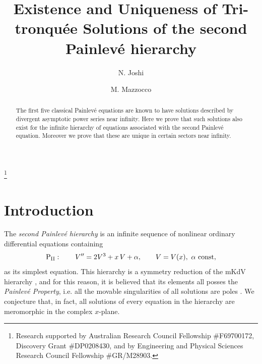 \documentclass{amsart}
\theoremstyle{definition}
\theoremstyle{remark}
\theoremstyle{remark}
\begin{document}
\newcommand\Pa{Painlev\'e}
\newcommand\Pt{{\rm P}_{\rm{\scriptstyle II}}}
\newcommand\Ptn{{\rm P}^{(n)}_{\rm{\scriptstyle II}}}
\newcommand\Lr{{\mathcal L}}
\newcommand\Pol{{\mathcal P}}
\newcommand\Se{{\mathcal S}}
\newcommand\A{{\mathcal A}}
\newcommand\M{{\mathsf M}}
\newcommand\Complex{{\mathbb C}}
\newcommand\Real{{\mathbb R}}
\newcommand{\ID}{\mathbb{1}}
\newcommand\Integer{{\mathbb Z}}
\def\ddt{{{\rm d}\over{\rm d} t}}
\def\ddx{{{\rm d}\over{\rm d} x}}
\def\ddtt{{{\rm d}\over{\rm d}\tau}}
\def\ddz{{{\rm d}\over{\rm d} z}}
\def\thi{{\vartheta_\infty}}
\def\eps{\varepsilon}
\def\arg{{\rm arg}}
\def\iff{\Longleftrightarrow}
\def\U{{\mathcal U}}


\title[Tritronqu\'ee Solutions of the Second Painlev\'e Hierarchy]
{Existence and
Uniqueness of Tri-tronqu\'ee Solutions of the second Painlev\'e
hierarchy}

\author{N. Joshi}
\address{School of Mathematics and Statistics F07, University of Sydney,
NSW2006 Sydney, Australia}
\thanks{Research supported by Australian Research Council Fellowship
\#F69700172, Discovery Grant \#DP0208430, and by Engineering and
Physical Sciences Research Council Fellowship \#GR/M28903.}
\author{M. Mazzocco}
\address{Mathematical Institute, University of Oxford, 24-29 St Giles, Oxford
OX1 3LB, UK and DPMMS, Wilberforce Road, Cambridge
CB3 0WB, UK.}

\begin{abstract}
The first five classical Painlev\'e equations are known to have solutions
described by divergent asymptotic power series near infinity. Here we
prove that such solutions also exist for the infinite
hierarchy of equations associated with the second Painlev\'e equation.
Moreover we prove that these are unique in certain sectors near infinity.
\end{abstract}
\maketitle

\section{Introduction}
The {\it second Painlev\'e hierarchy}\/ is an infinite sequence of
nonlinear ordinary differential equations containing
\begin{equation}
\label{p2}
\Pt :\quad\quad V'' = 2V^3+x\,V+\alpha ,
\qquad V=V(x),\ \alpha\ \rm{const},
\end{equation}
as its simplest equation. This hierarchy is a
symmetry reduction of the mKdV hierarchy \cite{AS,Ai,FN},
and for this reason, it is believed that its elements
all posses the {\em Painlev\'e Property}\/, i.e.
all the movable singularities of all solutions are poles
\cite{Pain}. We conjecture that, in fact, all solutions of every equation
in the hierarchy are meromorphic in the complex
$x$-plane.
\end{document}
